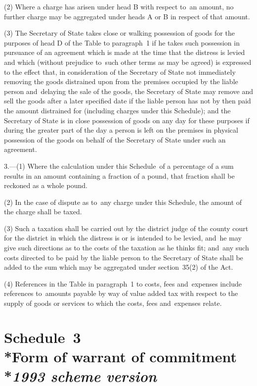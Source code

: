 \documentclass[12pt,a4paper]{article}
\begin{document}
(2) Where a charge has arisen under head B with respect to~an amount, no further charge may be aggregated under heads A or B in respect of that amount.

(3) The Secretary of State takes close or walking possession of goods for the purposes of head D of the Table to paragraph~1 if he takes such possession in pursuance of an agreement which is made at the time that the distress is levied and which (without prejudice to~such other terms as may be agreed) is expressed to the effect that, in consideration of the Secretary of State not immediately removing the goods distrained upon from the premises occupied by the liable person and~delaying the sale of the goods, the Secretary of State may remove and sell the goods after a later specified date if the liable person has not by then paid the amount distrained for (including charges under this Schedule); and the Secretary of State is in close possession of goods on any day for these purposes if during the greater part of the day a person is left on the premises in physical possession of the goods on behalf of the Secretary of State under such an agreement.

\medskip

3.—(1) Where the calculation under this Schedule~of a percentage of a sum results in an amount containing a fraction of a pound, that fraction shall be reckoned as a whole pound.

(2) In the case of dispute as to~any charge under this Schedule, the amount of the charge shall be taxed.

(3) Such a taxation shall be carried out by the district judge of the county court for the district in which the distress is or is intended to be levied, and~he may give such directions as to the costs of the taxation as he thinks fit; and~any such costs directed to be paid by the liable person to the Secretary of State shall be added to the sum which may be aggregated under section~35(2) of the Act.

(4) References in the Table in paragraph~1 to costs, fees and~expenses include references to~amounts payable by way of value added tax with respect to the supply of goods or services to which the costs, fees and~expenses relate.

\part[Schedule~3 --- Form of warrant of commitment --- \emph{1993 scheme version}]{Schedule~3\\*Form of warrant of commitment\\*\emph{1993 scheme version}}
\end{document}
